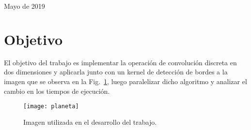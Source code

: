 \documentclass[12pt]{article}
\begin{document}
\begin{titlepage}

{\large Mayo de 2019}\\[2cm] %

\vfill %

\end{titlepage}

\section{Objetivo}
El objetivo del trabajo es implementar la operaci\'on de convoluci\'on discreta
en dos dimensiones y aplicarla junto con un kernel de detecci\'on de bordes a la
imagen que se observa en la Fig.~\ref{mundo}, luego paralelizar dicho algoritmo y analizar el cambio en
los tiempos de ejecuci\'on.

\begin{figure}
\centering
\texttt{[image: planeta]}
\caption{Imagen utilizada en el desarrollo del trabajo.}
\label{mundo}
\end{figure}
\end{document}
